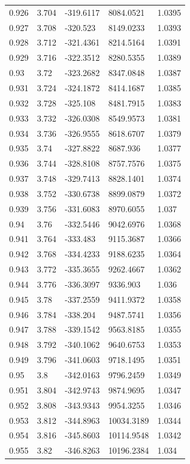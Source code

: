 \begin{tabular}{lllll}
0.926 & 3.704 & -319.6117 & 8084.0521 & 1.0395 \\
0.927 & 3.708 & -320.523 & 8149.0233 & 1.0393 \\
0.928 & 3.712 & -321.4361 & 8214.5164 & 1.0391 \\
0.929 & 3.716 & -322.3512 & 8280.5355 & 1.0389 \\
0.93 & 3.72 & -323.2682 & 8347.0848 & 1.0387 \\
0.931 & 3.724 & -324.1872 & 8414.1687 & 1.0385 \\
0.932 & 3.728 & -325.108 & 8481.7915 & 1.0383 \\
0.933 & 3.732 & -326.0308 & 8549.9573 & 1.0381 \\
0.934 & 3.736 & -326.9555 & 8618.6707 & 1.0379 \\
0.935 & 3.74 & -327.8822 & 8687.936 & 1.0377 \\
0.936 & 3.744 & -328.8108 & 8757.7576 & 1.0375 \\
0.937 & 3.748 & -329.7413 & 8828.1401 & 1.0374 \\
0.938 & 3.752 & -330.6738 & 8899.0879 & 1.0372 \\
0.939 & 3.756 & -331.6083 & 8970.6055 & 1.037 \\
0.94 & 3.76 & -332.5446 & 9042.6976 & 1.0368 \\
0.941 & 3.764 & -333.483 & 9115.3687 & 1.0366 \\
0.942 & 3.768 & -334.4233 & 9188.6235 & 1.0364 \\
0.943 & 3.772 & -335.3655 & 9262.4667 & 1.0362 \\
0.944 & 3.776 & -336.3097 & 9336.903 & 1.036 \\
0.945 & 3.78 & -337.2559 & 9411.9372 & 1.0358 \\
0.946 & 3.784 & -338.204 & 9487.5741 & 1.0356 \\
0.947 & 3.788 & -339.1542 & 9563.8185 & 1.0355 \\
0.948 & 3.792 & -340.1062 & 9640.6753 & 1.0353 \\
0.949 & 3.796 & -341.0603 & 9718.1495 & 1.0351 \\
0.95 & 3.8 & -342.0163 & 9796.2459 & 1.0349 \\
0.951 & 3.804 & -342.9743 & 9874.9695 & 1.0347 \\
0.952 & 3.808 & -343.9343 & 9954.3255 & 1.0346 \\
0.953 & 3.812 & -344.8963 & 10034.3189 & 1.0344 \\
0.954 & 3.816 & -345.8603 & 10114.9548 & 1.0342 \\
0.955 & 3.82 & -346.8263 & 10196.2384 & 1.034 \\

\end{tabular}
